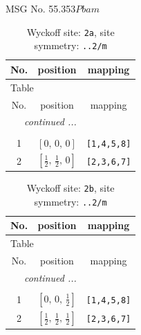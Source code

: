 \documentclass[fleqn,8pt]{jsarticle}
\begin{document}
\setcounter{MaxMatrixCols}{32}

\renewcommand{\tablename}{Table~}
\renewcommand{\figurename}{Figure~}
\begin{center}
\LARGE
MSG No. 55.353\quad$Pbam$
\end{center}
\renewcommand{\arraystretch}{1.2}
\begin{longtable}{ccc}
\caption{Wyckoff site: {\tt 2a}, site symmetry: {\tt ..2/m}}
 \\
 \hline \hline
No. & position & mapping \\ \hline \endfirsthead

\multicolumn{2}{l}{\tablename\ \thetable{}} \\
 \hline \hline
No. & position & mapping \\ \hline \endhead

 \hline \hline
\multicolumn{2}{r}{\footnotesize\it continued ...} \\ \endfoot

 \hline \hline
\multicolumn{2}{r}{} \\ \endlastfoot

1 & $\left[ 0,\, 0,\, 0 \right]$ & {\tt [1,4,5,8]} \\ \hline
2 & $\left[ \frac{1}{2},\, \frac{1}{2},\, 0 \right]$ & {\tt [2,3,6,7]} \\
\end{longtable}
\renewcommand{\arraystretch}{1.2}
\begin{longtable}{ccc}
\caption{Wyckoff site: {\tt 2b}, site symmetry: {\tt ..2/m}}
 \\
 \hline \hline
No. & position & mapping \\ \hline \endfirsthead

\multicolumn{2}{l}{\tablename\ \thetable{}} \\
 \hline \hline
No. & position & mapping \\ \hline \endhead

 \hline \hline
\multicolumn{2}{r}{\footnotesize\it continued ...} \\ \endfoot

 \hline \hline
\multicolumn{2}{r}{} \\ \endlastfoot

1 & $\left[ 0,\, 0,\, \frac{1}{2} \right]$ & {\tt [1,4,5,8]} \\ \hline
2 & $\left[ \frac{1}{2},\, \frac{1}{2},\, \frac{1}{2} \right]$ & {\tt [2,3,6,7]} \\
\end{longtable}
\end{document}
